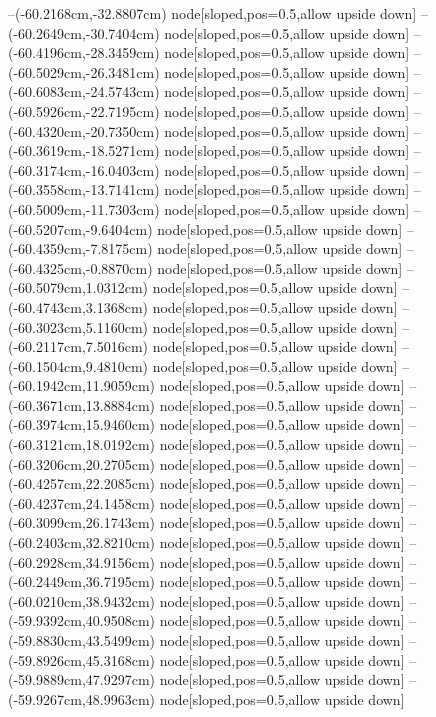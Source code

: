 --(-60.2168cm,-32.8807cm) node[sloped,pos=0.5,allow upside down]{\ArrowIn}
--(-60.2649cm,-30.7404cm) node[sloped,pos=0.5,allow upside down]{\ArrowIn}
--(-60.4196cm,-28.3459cm) node[sloped,pos=0.5,allow upside down]{\ArrowIn}
--(-60.5029cm,-26.3481cm) node[sloped,pos=0.5,allow upside down]{\ArrowIn}
--(-60.6083cm,-24.5743cm) node[sloped,pos=0.5,allow upside down]{\ArrowIn}
--(-60.5926cm,-22.7195cm) node[sloped,pos=0.5,allow upside down]{\ArrowIn}
--(-60.4320cm,-20.7350cm) node[sloped,pos=0.5,allow upside down]{\ArrowIn}
--(-60.3619cm,-18.5271cm) node[sloped,pos=0.5,allow upside down]{\ArrowIn}
--(-60.3174cm,-16.0403cm) node[sloped,pos=0.5,allow upside down]{\ArrowIn}
--(-60.3558cm,-13.7141cm) node[sloped,pos=0.5,allow upside down]{\ArrowIn}
--(-60.5009cm,-11.7303cm) node[sloped,pos=0.5,allow upside down]{\ArrowIn}
--(-60.5207cm,-9.6404cm) node[sloped,pos=0.5,allow upside down]{\ArrowIn}
--(-60.4359cm,-7.8175cm) node[sloped,pos=0.5,allow upside down]{\ArrowIn}
--(-60.4325cm,-0.8870cm) node[sloped,pos=0.5,allow upside down]{\ArrowIn}
--(-60.5079cm,1.0312cm) node[sloped,pos=0.5,allow upside down]{\ArrowIn}
--(-60.4743cm,3.1368cm) node[sloped,pos=0.5,allow upside down]{\ArrowIn}
--(-60.3023cm,5.1160cm) node[sloped,pos=0.5,allow upside down]{\ArrowIn}
--(-60.2117cm,7.5016cm) node[sloped,pos=0.5,allow upside down]{\ArrowIn}
--(-60.1504cm,9.4810cm) node[sloped,pos=0.5,allow upside down]{\ArrowIn}
--(-60.1942cm,11.9059cm) node[sloped,pos=0.5,allow upside down]{\ArrowIn}
--(-60.3671cm,13.8884cm) node[sloped,pos=0.5,allow upside down]{\ArrowIn}
--(-60.3974cm,15.9460cm) node[sloped,pos=0.5,allow upside down]{\ArrowIn}
--(-60.3121cm,18.0192cm) node[sloped,pos=0.5,allow upside down]{\ArrowIn}
--(-60.3206cm,20.2705cm) node[sloped,pos=0.5,allow upside down]{\ArrowIn}
--(-60.4257cm,22.2085cm) node[sloped,pos=0.5,allow upside down]{\ArrowIn}
--(-60.4237cm,24.1458cm) node[sloped,pos=0.5,allow upside down]{\ArrowIn}
--(-60.3099cm,26.1743cm) node[sloped,pos=0.5,allow upside down]{\ArrowIn}
--(-60.2403cm,32.8210cm) node[sloped,pos=0.5,allow upside down]{\ArrowIn}
--(-60.2928cm,34.9156cm) node[sloped,pos=0.5,allow upside down]{\ArrowIn}
--(-60.2449cm,36.7195cm) node[sloped,pos=0.5,allow upside down]{\ArrowIn}
--(-60.0210cm,38.9432cm) node[sloped,pos=0.5,allow upside down]{\ArrowIn}
--(-59.9392cm,40.9508cm) node[sloped,pos=0.5,allow upside down]{\ArrowIn}
--(-59.8830cm,43.5499cm) node[sloped,pos=0.5,allow upside down]{\ArrowIn}
--(-59.8926cm,45.3168cm) node[sloped,pos=0.5,allow upside down]{\ArrowIn}
--(-59.9889cm,47.9297cm) node[sloped,pos=0.5,allow upside down]{\ArrowIn}
--(-59.9267cm,48.9963cm) node[sloped,pos=0.5,allow upside down]{\ArrowIn}
